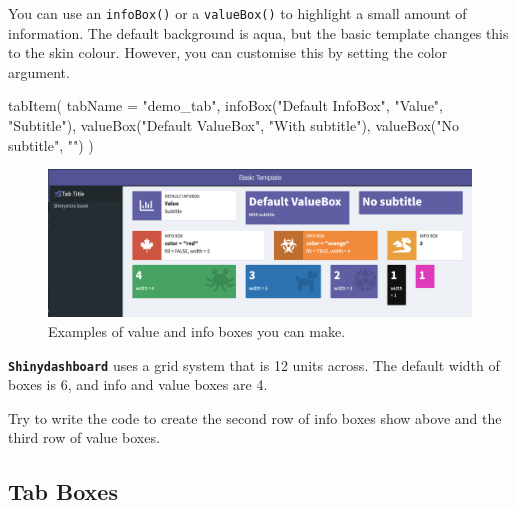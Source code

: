 \documentclass[
  oneside]{book}
\newenvironment{Shaded}{\begin{snugshade}}{\end{snugshade}}
\newcommand{\AttributeTok}[1]{\textcolor[rgb]{0.77,0.63,0.00}{#1}}
\newcommand{\DecValTok}[1]{\textcolor[rgb]{0.00,0.00,0.81}{#1}}
\newcommand{\FunctionTok}[1]{\textcolor[rgb]{0.00,0.00,0.00}{#1}}
\newcommand{\NormalTok}[1]{#1}
\newcommand{\StringTok}[1]{\textcolor[rgb]{0.31,0.60,0.02}{#1}}
\begin{document}
You can use an \texttt{infoBox}\texttt{()} or a \texttt{valueBox}\texttt{()} to highlight a small amount of information. The default background is aqua, but the basic template changes this to the skin colour. However, you can customise this by setting the \AttributeTok{color} argument.

\begin{Shaded}
\begin{Highlighting}[]
\FunctionTok{tabItem}\NormalTok{(}
    \AttributeTok{tabName =} \StringTok{"demo\_tab"}\NormalTok{,}
    \FunctionTok{infoBox}\NormalTok{(}\StringTok{"Default InfoBox"}\NormalTok{, }\StringTok{"Value"}\NormalTok{, }\StringTok{"Subtitle"}\NormalTok{),}
    \FunctionTok{valueBox}\NormalTok{(}\StringTok{"Default ValueBox"}\NormalTok{, }\StringTok{"With subtitle"}\NormalTok{),}
    \FunctionTok{valueBox}\NormalTok{(}\StringTok{"No subtitle"}\NormalTok{, }\StringTok{""}\NormalTok{)}
\NormalTok{)}
\end{Highlighting}
\end{Shaded}

\begin{figure}

{\centering \includegraphics[width=1\linewidth]{images/sdb_value_info} 

}

\caption{Examples of value and info boxes you can make.}\label{fig:sdb-value-info}
\end{figure}

\textbf{\texttt{Shinydashboard}} uses a grid system that is \DecValTok{12} units across. The default width of boxes is \DecValTok{6}, and info and value boxes are \DecValTok{4}.

\begin{try}
Try to write the code to create the second row of info boxes show above and the third row of value boxes.

\end{try}

\hypertarget{tab-boxes}{%
\subsection{Tab Boxes}\label{tab-boxes}}
\end{document}
